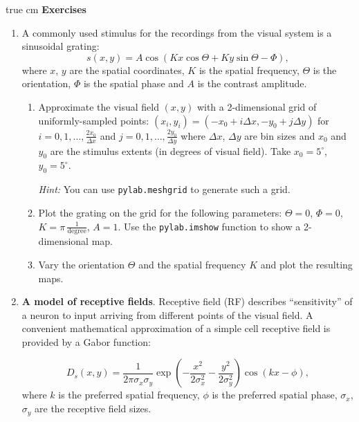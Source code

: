 \documentclass[12pt, a4]{article}
\begin{document}
 true cm
{\bf Exercises}
\begin{enumerate}

    \item  A commonly used stimulus for the recordings from the visual
        system is a sinusoidal grating:
        \begin{equation}
            s(x, y) = A \cos(Kx\cos\Theta + Ky\sin\Theta
            -\Phi),
            \label{eq:grating}
        \end{equation}
        where $x$, $y$ are the spatial coordinates, $K$ is the spatial
        frequency, $\Theta$ is the orientation,  $\Phi$ is the spatial
        phase and $A$ is the contrast amplitude.

        \begin{enumerate}
            \item Approximate the visual field $(x,y)$ with a
                2-dimensional grid of uniformly-sampled points:
                $(x_i, y_i)= (-x_0+i\Delta x, -y_0+j\Delta y)$ for
                $i=0,1,\dots, \frac{2x_0}{\Delta x}$ and $j=0,1,\dots,
                \frac{2y_0}{\Delta y}$ where $\Delta x$, $\Delta y$
                are bin sizes and $x_0$ and $y_0$ are the
                stimulus extents (in degrees of visual field). Take
                $x_0=5^\circ$, $y_0=5^\circ$.
                
                \textit{Hint:} You can use
                \texttt{pylab.meshgrid} to generate such a grid. 
            \item \label{ex:grating} Plot the grating on the
                grid for the following parameters: $\Theta=0$,
                $\Phi=0$, $K=\pi\,\frac{1}{\mathrm{degree}}$, $A=1$.  Use the 
                \texttt{pylab.imshow} function to show a 2-dimensional map. 
            \item \label{ex:varygrating}Vary the orientation $\Theta$ and the
                spatial frequency $K$ and plot the resulting maps.
        \end{enumerate}

    \item \textbf{A model of receptive fields}.  Receptive field (RF) describes
                ``sensitivity'' of a neuron to input arriving from
                different points of the visual field. A convenient mathematical
                approximation of a simple cell receptive field is provided by a Gabor
        function:

        \begin{equation}
           D_s(x,y)=\frac{1}{2\pi\sigma_x\sigma_y}
            \exp\left(-\frac{x^2}{2\sigma_x^2}-\frac
            {y^2}{ 2\sigma_y^2}\right)\cos(kx-\phi),
            \label{eq:Gabor}
        \end{equation}
        where  $k$ is the preferred spatial frequency, $\phi$ is
        the preferred spatial phase,  $\sigma_x$,
        $\sigma_y$ are the receptive field sizes.


\end{enumerate}
\end{document}
